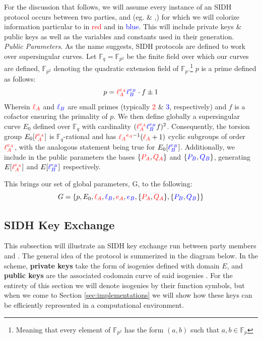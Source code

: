 For the discussion that follows, we will assume every instance of an SIDH protocol occurs between two parties, \ba and \rb (eg. \alice \& \bob,) for which we will colorize information particular to \ba in \textcolor{red}{red} and \rb in \textcolor{blue}{blue}. This will include private keys \& public keys as well as the variables and constants used in their generation.\\

\noindent
\emph{Public Parameters}. As the name suggests, SIDH protocols are defined to work over supersingular curves. Let $\mathbb{F}_q = \mathbb{F}_{p^2}$ be the finite field over which our curves are defined, $\mathbb{F}_{p^2}$ denoting the quadratic extension field of $\mathbb{F}_{p}$.\footnote{Meaning that every element of $\mathbb{F}_{p^2}$ has the form $(a, b)$ such that $a, b \in \mathbb{F}_p$}  $p$ is a prime defined as follows:
$$
p = \textcolor{red}{\ell_{A}^{e_A}} \textcolor{blue}{\ell_{B}^{e_B}} \cdot f \pm 1
$$
Wherein $\textcolor{red}{\ell_{A}}$ and $\textcolor{blue}{\ell_{B}}$ are small primes (typically \textcolor{red}{2} \& \textcolor{blue}{3}, respectively) and $f$ is a cofactor ensuring the primality of $p$. We then define globally a supersingular curve $E_0$ defined over $\mathbb{F}_q$ with cardinality $(\textcolor{red}{\ell_{A}^{e_A}} \textcolor{blue}{\ell_{B}^{e_B}} f)^2$. Consequently, the torsion group $E_0[\textcolor{red}{\ell_{A}^{e_A}}]$ is $\mathbb{F}_q$-rational and has $\textcolor{red}{\ell_{A}}^{\textcolor{red}{e_A} - 1} (\textcolor{red}{\ell_{A}} + 1)$ cyclic subgroups of order $\textcolor{red}{\ell_{A}^{e_A}}$, with the analogous statement being true for $E_0[\textcolor{blue}{\ell_{B}^{e_B}}]$. Additionally, we include in the public parameters the bases $\{\textcolor{red}{P_A},\textcolor{red}{Q_A}\}$ and $\{\textcolor{blue}{P_B},\textcolor{blue}{Q_B}\}$, generating $E[\textcolor{red}{\ell_{A}^{e_A}}]$ and $E[\textcolor{blue}{\ell_{B}^{e_B}}]$ respectively.

This brings our set of global parameters, G, to the following:\\
$$
G = \{p,E_0,\textcolor{red}{\ell_{A}},\textcolor{blue}{\ell_{B}},\textcolor{red}{e_A},\textcolor{blue}{e_B},\{\textcolor{red}{P_A},\textcolor{red}{Q_A}\},\{\textcolor{blue}{P_B},\textcolor{blue}{Q_B}\}\}
$$



\subsection{SIDH Key Exchange}
\label{subsec:sidhkex}

This subsection will illustrate an SIDH key exchange run between party members \alice and \bob. The general idea of the protocol is summerized in the diagram below. In the scheme, \textbf{private keys} take the form of isogenies defined with domain $E$, and \textbf{public keys} are the associated codomain curve of said isogenies \cite{djp}. For the entirety of this section we will denote isogenies by their function symbols, but when we come to Section \ref{sec:implementations} we will show how these keys can be efficiently represented in a computational environment.

